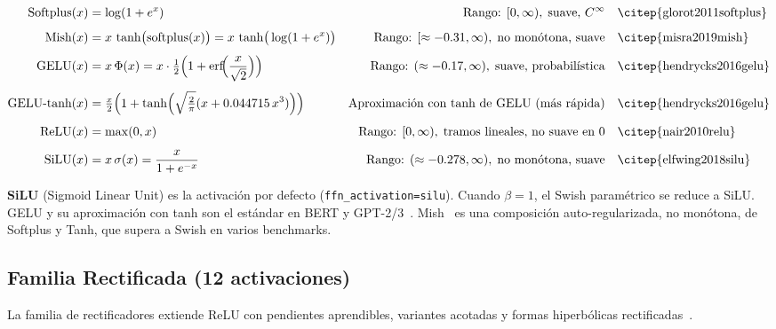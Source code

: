 {\scriptsize
\begin{align}
  \text{Softplus}(x) &= \log(1+e^{x})
    & \text{Rango: } [0,\infty),\;\text{suave, }C^\infty
    & \quad \text{\citep{glorot2011softplus}} \\[4pt]
  \text{Mish}(x) &= x\,\tanh\!\big(\text{softplus}(x)\big)
    = x\,\tanh\!\big(\log(1+e^{x})\big)
    & \text{Rango: } [\approx{-0.31},\infty),\;\text{no monótona, suave}
    & \quad \text{\citep{misra2019mish}} \\[4pt]
  \text{GELU}(x) &= x\,\Phi(x) = x\cdot\tfrac{1}{2}\Big(1+\text{erf}\!\Big(\frac{x}{\sqrt{2}}\Big)\Big)
    & \text{Rango: } (\approx{-0.17},\infty),\;\text{suave, probabilística}
    & \quad \text{\citep{hendrycks2016gelu}} \\[4pt]
  \text{GELU-tanh}(x) &= \tfrac{x}{2}\Big(1+\tanh\!\Big(\sqrt{\tfrac{2}{\pi}}
    (x+0.044715\,x^{3})\Big)\Big)
    & \text{Aproximación con tanh de GELU (más rápida)}
    & \quad \text{\citep{hendrycks2016gelu}} \\[4pt]
  \text{ReLU}(x) &= \max(0,x)
    & \text{Rango: } [0,\infty),\;\text{tramos lineales, no suave en 0}
    & \quad \text{\citep{nair2010relu}} \\[4pt]
  \text{SiLU}(x) &= x\,\sigma(x) = \frac{x}{1+e^{-x}}
    & \text{Rango: } (\approx{-0.278},\infty),\;\text{no monótona, suave}
    & \quad \text{\citep{elfwing2018silu}}
\end{align}
}  %

\noindent\textbf{SiLU} (Sigmoid Linear Unit) es la activación por defecto
(\texttt{ffn\_activation=silu}). Cuando $\beta=1$, el Swish paramétrico se
reduce a SiLU. GELU y su aproximación con tanh son el estándar en BERT y
GPT-2/3~\citep{hendrycks2016gelu}. Mish~\citep{misra2019mish} es una
composición auto-regularizada, no monótona, de Softplus y Tanh, que supera a
Swish en varios benchmarks.

\subsection{Familia Rectificada (12 activaciones)}

La familia de rectificadores extiende ReLU con pendientes aprendibles,
variantes acotadas y formas hiperbólicas
rectificadas~\citep{nair2010relu,dubey2021activations}.

